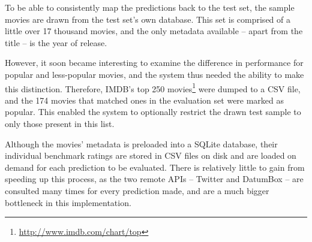 To be able to consistently map the predictions back to the test set, the sample movies are drawn from the test set's own database. This set is comprised of a little over 17 thousand movies, and the only metadata available -- apart from the title -- is the year of release.

However, it soon became interesting to examine the difference in performance for popular and less-popular movies, and the system thus needed the ability to make this distinction. Therefore, IMDB's top 250 movies\footnote{\url{http://www.imdb.com/chart/top}} were dumped to a CSV file, and the 174 movies that matched ones in the evaluation set were marked as popular. This enabled the system to optionally restrict the drawn test sample to only those present in this list.

Although the movies' metadata is preloaded into a SQLite database, their individual benchmark ratings are stored in CSV files on disk and are loaded on demand for each prediction to be evaluated. There is relatively little to gain from speeding up this process, as the two remote APIs -- Twitter and DatumBox -- are consulted many times for every prediction made, and are a much bigger bottleneck in this implementation.
